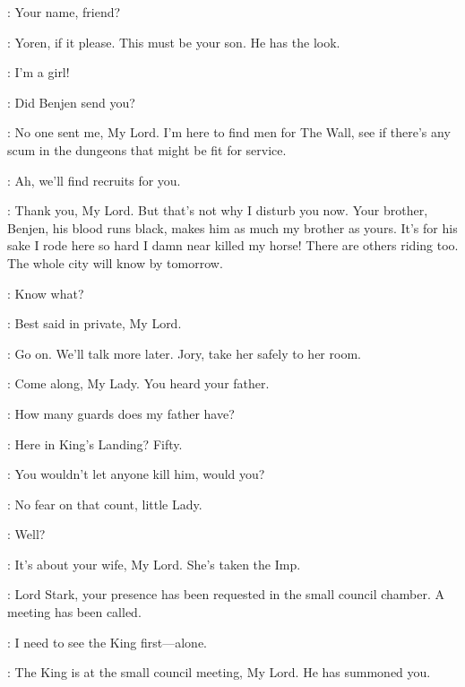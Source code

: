 
\NED: Your name, friend? 

\YOREN: Yoren, if it please. This must be your son. He has the look. 

\ARYA: I'm a girl! 

\NED: Did Benjen send you? 

\YOREN: No one sent me, My Lord. I'm here to find men for The Wall, see if there's any scum in the dungeons that might be fit for service. 

\NED: Ah, we'll find recruits for you. 

\YOREN: Thank you, My Lord. But that's not why I disturb you now. Your brother, Benjen, his blood runs black, makes him as much my brother as yours. It's for his sake I rode here so hard I damn near killed my horse! There are others riding too. The whole city will know by tomorrow. 

\NED: Know what? 

\YOREN: Best said in private, My Lord. 

\NED:  Go on. We'll talk more later. Jory, take her safely to her room. 

\JORY: Come along, My Lady. You heard your father. 


\ARYA: How many guards does my father have? 

\JORY: Here in King's Landing? Fifty. 

\ARYA: You wouldn't let anyone kill him, would you? 

\JORY: No fear on that count, little Lady. 


\NED: Well? 

\YOREN: It's about your wife, My Lord. She's taken the Imp. 

\scene



\STEWARD: Lord Stark, your presence has been requested in the small council chamber. A meeting has been called. 

\NED: I need to see the King first---alone. 

\STEWARD: The King is at the small council meeting, My Lord. He has summoned you. 

